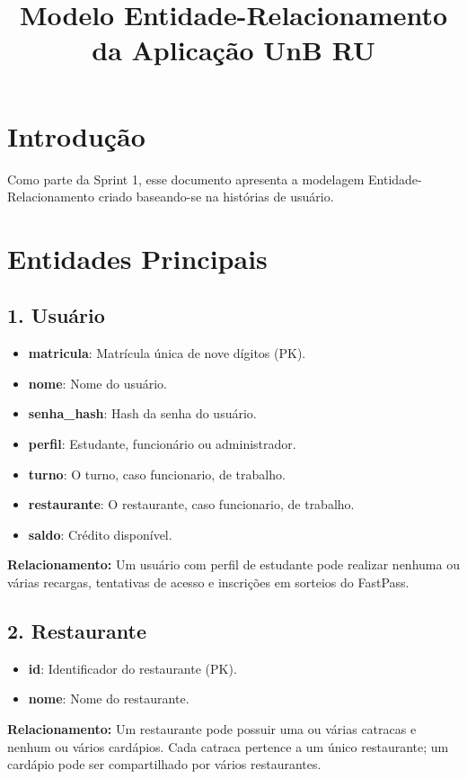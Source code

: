 \documentclass[a4paper,12pt]{article}
\title{Modelo Entidade-Relacionamento\\da Aplicação UnB RU}
\author{}
\date{}
\begin{document}
\maketitle
\section*{Introdução}
\begingroup\raggedright
Como parte da Sprint 1, esse documento apresenta a modelagem Entidade-Relacionamento criado baseando-se 
na histórias de usuário. 
\par\endgroup

\section*{Entidades Principais}
\subsection*{1. Usuário}
\begin{itemize}
    \item \textbf{matricula}: Matrícula única de nove dígitos (PK).
    \item \textbf{nome}: Nome do usuário.
    \item \textbf{senha\_hash}: Hash da senha do usuário.
    \item \textbf{perfil}: Estudante, funcionário ou administrador.
    \item \textbf{turno}: O turno, caso funcionario, de trabalho.
    \item \textbf{restaurante}: O restaurante, caso funcionario, de trabalho.
    \item \textbf{saldo}: Crédito disponível.
\end{itemize}
\noindent\textbf{Relacionamento:} Um usuário com perfil de estudante pode realizar 
nenhuma ou várias recargas, tentativas de acesso e inscrições em sorteios do FastPass. 

\subsection*{2. Restaurante}
\begin{itemize}
    \item \textbf{id}: Identificador do restaurante (PK).
    \item \textbf{nome}: Nome do restaurante.
\end{itemize}

\noindent\textbf{Relacionamento:} Um restaurante pode possuir uma ou várias 
catracas e nenhum ou vários cardápios. Cada catraca pertence a um único 
restaurante; um cardápio pode ser compartilhado por vários restaurantes.
\end{document}
